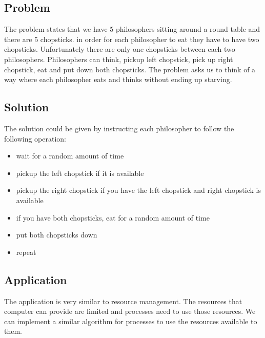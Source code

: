 \documentclass[journal,10pt,onecolumn,compsoc,letterpaper,draftclsnofoot,table,xcdraw]{IEEEtran} \usepackage[margin=0.75in]{geometry}
\begin{document}
\subsection{Problem}
\noindent The problem states that we have 5 philosophers sitting around a round table and there are 5 chopsticks. in order for each philosopher to eat they have to have two chopsticks. Unfortunately there are only one chopsticks between each two philosophers. Philosophers can think, pickup left chopstick, pick up right chopstick, eat and put down both chopsticks. The problem asks us to think of a way where each philosopher eats and thinks without ending up starving.

\subsection{Solution}
\noindent The solution could be given by instructing each philosopher to follow the following operation:
\begin{itemize}
\item wait for a random amount of time
\item pickup the left chopstick if it is available
\item pickup the right chopstick if you have the left chopstick and right chopstick is available
\item if you have both chopsticks, eat for a random amount of time
\item put both chopsticks down
\item repeat
\end{itemize}

\subsection{Application}
\noindent The application is very similar to resource management. The resources that computer can provide are limited and processes need to use those resources. We can implement a similar algorithm for processes to use the resources available to them.
\end{document}
